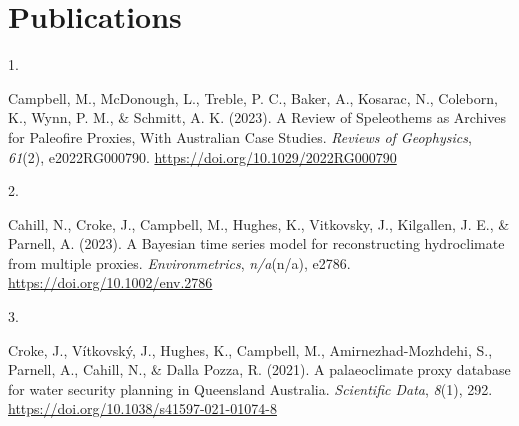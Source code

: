 \documentclass[11pt,a4paper,]{moderncv}
\newlength{\csllabelwidth}
\newcommand{\CSLLeftMargin}[1]{\parbox[t]{\csllabelwidth}{#1}}
\newcommand{\CSLRightInline}[1]{\parbox[t]{\linewidth - \csllabelwidth}{#1}}
\begin{document}

\hypertarget{publications}{%
\section{Publications}\label{publications}}

\hypertarget{bibliography}{}
\leavevmode{}%
\CSLLeftMargin{1. }%
\CSLRightInline{Campbell, M., McDonough, L., Treble, P. C., Baker, A.,
Kosarac, N., Coleborn, K., Wynn, P. M., \& Schmitt, A. K. (2023). A
Review of Speleothems as Archives for Paleofire Proxies, With Australian
Case Studies. \emph{Reviews of Geophysics}, \emph{61}(2), e2022RG000790.
\url{https://doi.org/10.1029/2022RG000790}}

\leavevmode{}%
\CSLLeftMargin{2. }%
\CSLRightInline{Cahill, N., Croke, J., Campbell, M., Hughes, K.,
Vitkovsky, J., Kilgallen, J. E., \& Parnell, A. (2023). A Bayesian time
series model for reconstructing hydroclimate from multiple proxies.
\emph{Environmetrics}, \emph{n/a}(n/a), e2786.
\url{https://doi.org/10.1002/env.2786}}

\leavevmode{}%
\CSLLeftMargin{3. }%
\CSLRightInline{Croke, J., Vítkovský, J., Hughes, K., Campbell, M.,
Amirnezhad-Mozhdehi, S., Parnell, A., Cahill, N., \& Dalla Pozza, R.
(2021). A palaeoclimate proxy database for water security planning in
Queensland Australia. \emph{Scientific Data}, \emph{8}(1), 292.
\url{https://doi.org/10.1038/s41597-021-01074-8}}
\end{document}
